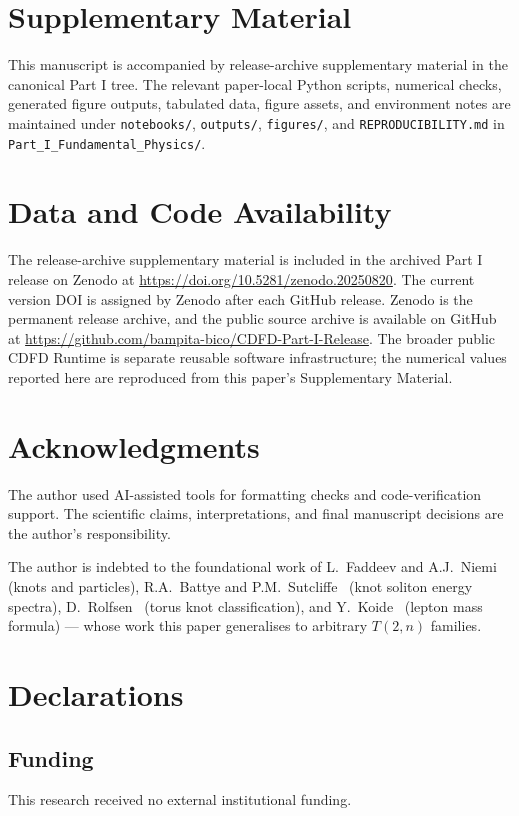 \documentclass[11pt]{article}
\begin{document}
\section*{Supplementary Material}

This manuscript is accompanied by release-archive supplementary material in
the canonical Part I tree. The relevant paper-local Python scripts, numerical checks, generated figure outputs,
tabulated data, figure assets, and environment notes are maintained under
\texttt{notebooks/}, \texttt{outputs/}, \texttt{figures/}, and
\texttt{REPRODUCIBILITY.md} in \texttt{Part\_I\_Fundamental\_Physics/}.


\section*{Data and Code Availability}

The release-archive supplementary material is included in the archived Part I
release on Zenodo at \url{https://doi.org/10.5281/zenodo.20250820}. The current version DOI is assigned by Zenodo after each GitHub release. Zenodo is the
permanent release archive, and the public source archive is available on GitHub at
\url{https://github.com/bampita-bico/CDFD-Part-I-Release}. The broader public CDFD
Runtime is separate reusable software infrastructure; the numerical values reported
here are reproduced from this paper's Supplementary Material.


\section*{Acknowledgments}
The author used AI-assisted tools for formatting checks and code-verification
support. The scientific claims, interpretations, and final manuscript decisions
are the author's responsibility.

The author is indebted to the foundational work of
L.~Faddeev and A.J.~Niemi~\cite{FaddeevNiemi1997} (knots and particles),
R.A.~Battye and P.M.~Sutcliffe~\cite{BattyeSutcliffe1998}
(knot soliton energy spectra),
D.~Rolfsen~\cite{Rolfsen1976} (torus knot classification),
and Y.~Koide~\cite{Koide1983} (lepton mass formula)
--- whose work this paper generalises to arbitrary $T(2,n)$ families.

\section*{Declarations}

\subsection*{Funding}
This research received no external institutional funding.
\end{document}
